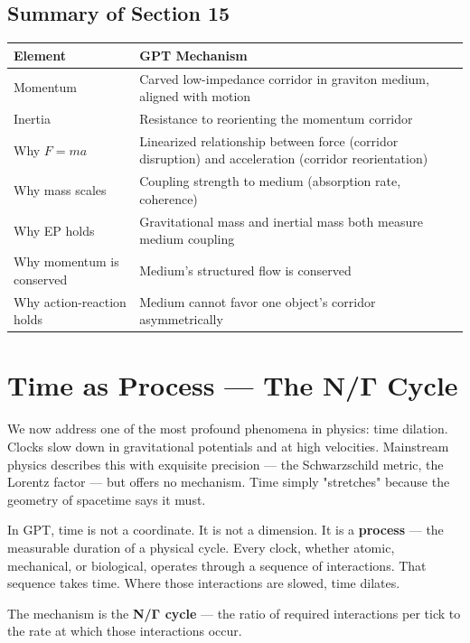 \documentclass[12pt, a4paper]{article}
\begin{document}
\subsection{Summary of Section 15}
\label{subsec:summary_15}

\begin{center}
\begin{tabular}{|p{4cm}|p{10cm}|}
\hline
\textbf{Element} & \textbf{GPT Mechanism} \\
\hline
Momentum & Carved low-impedance corridor in graviton medium, aligned with motion \\
\hline
Inertia & Resistance to reorienting the momentum corridor \\
\hline
Why \( F = ma \) & Linearized relationship between force (corridor disruption) and acceleration (corridor reorientation) \\
\hline
Why mass scales & Coupling strength to medium (absorption rate, coherence) \\
\hline
Why EP holds & Gravitational mass and inertial mass both measure medium coupling \\
\hline
Why momentum is conserved & Medium's structured flow is conserved \\
\hline
Why action-reaction holds & Medium cannot favor one object's corridor asymmetrically \\
\hline
\end{tabular}
\end{center}

\section{Time as Process — The N/Γ Cycle}
\label{sec:time_process}

We now address one of the most profound phenomena in physics: time dilation. Clocks slow down in gravitational potentials and at high velocities. Mainstream physics describes this with exquisite precision — the Schwarzschild metric, the Lorentz factor — but offers no mechanism. Time simply "stretches" because the geometry of spacetime says it must.

In GPT, time is not a coordinate. It is not a dimension. It is a \textbf{process} — the measurable duration of a physical cycle. Every clock, whether atomic, mechanical, or biological, operates through a sequence of interactions. That sequence takes time. Where those interactions are slowed, time dilates.

The mechanism is the \textbf{N/Γ cycle} — the ratio of required interactions per tick to the rate at which those interactions occur.
\end{document}
